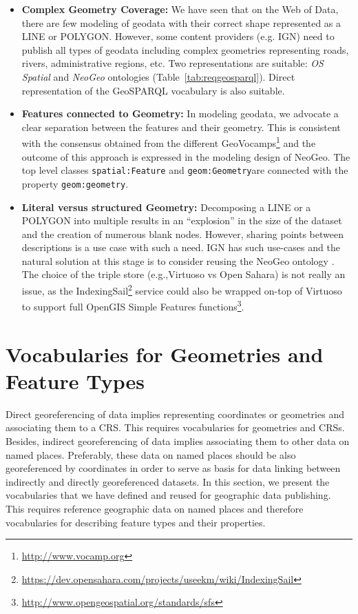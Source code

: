 \begin{itemize}
\item\textbf{Complex Geometry Coverage:} We have seen that on the Web of Data, there are few modeling of geodata with their correct shape represented as a LINE or POLYGON. However, some content providers (e.g. IGN) need to publish all types of geodata including complex geometries representing roads, rivers, administrative regions, etc. Two representations are suitable: \textit{OS Spatial} and \textit{NeoGeo} ontologies (Table~\ref{tab:reqgeosparql}). Direct representation of the GeoSPARQL vocabulary is also suitable.
\item \textbf{Features connected to Geometry:} In modeling geodata, we advocate a clear separation between the features and their geometry. This is consistent with the consensus obtained from the different GeoVocamps\footnote{\url{http://www.vocamp.org}} and the outcome of this approach is expressed in the modeling design of NeoGeo. The top level classes \texttt{spatial:Feature} and \texttt{geom:Geometry}are connected with the property \texttt{geom:geometry}.

\item \textbf{Literal versus structured Geometry:} Decomposing a LINE or a POLYGON into multiple results in an ``explosion'' in the size of the dataset and the creation of numerous blank nodes. However, sharing points between descriptions is a use case with such a need. IGN has such use-cases and the natural solution at this stage is to consider reusing the NeoGeo ontology . The choice of the triple store (e.g.,Virtuoso vs Open Sahara) is not really an issue, as the IndexingSail\footnote{\url{https://dev.opensahara.com/projects/useekm/wiki/IndexingSail}} service could also be wrapped on-top of Virtuoso to support full OpenGIS Simple Features functions\footnote{\url{http://www.opengeospatial.org/standards/sfs}}.
\end{itemize}


\section{Vocabularies for Geometries and Feature Types} \label{sec:geomfeaturevocab}

Direct georeferencing of data implies representing coordinates or geometries and associating them to a CRS.  This requires vocabularies for geometries and CRSs. Besides, indirect georeferencing of data implies associating them to other data on named places. Preferably, these data on named places should be also georeferenced by coordinates in order to serve as basis for data linking between indirectly and directly georeferenced datasets. In this section, we present the vocabularies that we have defined and reused for geographic data publishing.
This requires reference geographic data on named places and therefore vocabularies for describing feature types and their properties. 


